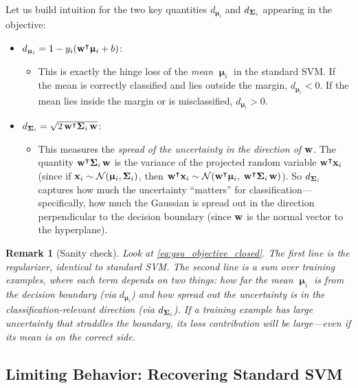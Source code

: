 \documentclass[11pt, letterpaper]{article}
\newcommand{\bSigma}{\vb{\Sigma}}
\newcommand{\bmu}{\boldsymbol{\upmu}}
\newcommand{\Norm}{\mathcal{N}}
\newtheorem{remark}{Remark}[section]
\begin{document}
Let us build intuition for the two key quantities $d_{\bmu_i}$ and $d_{\bSigma_i}$ appearing in the objective:
\begin{itemize}
    \item $d_{\bmu_i} = 1 - y_i(\vb{w}^{\intercal} \bmu_i + b)$:
    \begin{itemize}
        \item This is exactly the hinge loss of the \emph{mean} $\bmu_i$ in the standard SVM. If the mean is correctly classified and lies outside the margin, $d_{\bmu_i} < 0$. If the mean lies inside the margin or is misclassified, $d_{\bmu_i} > 0$.
    \end{itemize}
    \item $d_{\bSigma_i} = \sqrt{2\, \vb{w}^{\intercal} \bSigma_i\, \vb{w}}$:
    \begin{itemize}
        \item This measures the \emph{spread of the uncertainty in the direction of $\vb{w}$}. The quantity $\vb{w}^{\intercal} \bSigma_i\, \vb{w}$ is the variance of the projected random variable $\vb{w}^{\intercal} \vb{x}_i$ (since if $\vb{x}_i \sim \Norm(\bmu_i, \bSigma_i)$, then $\vb{w}^{\intercal} \vb{x}_i \sim \Norm(\vb{w}^{\intercal} \bmu_i,\; \vb{w}^{\intercal} \bSigma_i\, \vb{w})$). So $d_{\bSigma_i}$ captures how much the uncertainty ``matters'' for classification---specifically, how much the Gaussian is spread out in the direction perpendicular to the decision boundary (since $\vb{w}$ is the normal vector to the hyperplane).
    \end{itemize}
\end{itemize}

\begin{remark}[Sanity check]
Look at \cref{eq:gsu_objective_closed}. The first line is the regularizer, identical to standard SVM. The second line is a sum over training examples, where each term depends on two things: how far the mean $\bmu_i$ is from the decision boundary (via $d_{\bmu_i}$) and how spread out the uncertainty is in the classification-relevant direction (via $d_{\bSigma_i}$). If a training example has large uncertainty that straddles the boundary, its loss contribution will be large---even if its mean is on the correct side.
\end{remark}

\subsection{Limiting Behavior: Recovering Standard SVM}
\end{document}
